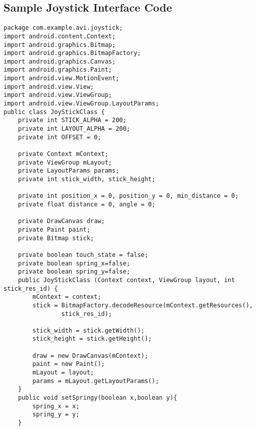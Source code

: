 \subsection{Sample Joystick Interface Code}
\begin{lstlisting}
package com.example.avi.joystick;
import android.content.Context;
import android.graphics.Bitmap;
import android.graphics.BitmapFactory;
import android.graphics.Canvas;
import android.graphics.Paint;
import android.view.MotionEvent;
import android.view.View;
import android.view.ViewGroup;
import android.view.ViewGroup.LayoutParams;
public class JoyStickClass {
    private int STICK_ALPHA = 200;
    private int LAYOUT_ALPHA = 200;
    private int OFFSET = 0;
    
    private Context mContext;
    private ViewGroup mLayout;
    private LayoutParams params;
    private int stick_width, stick_height;
    
    private int position_x = 0, position_y = 0, min_distance = 0;
    private float distance = 0, angle = 0;
    
    private DrawCanvas draw;
    private Paint paint;
    private Bitmap stick;
    
    private boolean touch_state = false;
    private boolean spring_x=false;
    private boolean spring_y=false;
    public JoyStickClass (Context context, ViewGroup layout, int stick_res_id) {
        mContext = context;
        stick = BitmapFactory.decodeResource(mContext.getResources(),
                stick_res_id);
        
        stick_width = stick.getWidth();
        stick_height = stick.getHeight();
        
        draw = new DrawCanvas(mContext);
        paint = new Paint();
        mLayout = layout;
        params = mLayout.getLayoutParams();
    }
    public void setSpringy(boolean x,boolean y){
        spring_x = x;
        spring_y = y;
    }
    

\end{lstlisting}
